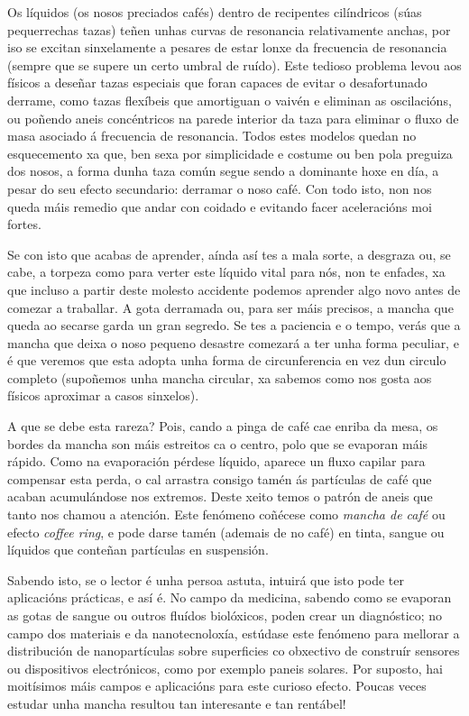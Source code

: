 \begin{multicols}{2}
Os líquidos (os nosos preciados cafés) dentro de recipentes cilíndricos (súas
pequerrechas tazas) teñen unhas curvas de resonancia relativamente anchas, por
iso se excitan sinxelamente a pesares de estar lonxe da frecuencia de resonancia
(sempre que se supere un certo umbral de ruído). Este tedioso problema levou
aos físicos a deseñar tazas especiais que foran capaces de evitar o
desafortunado derrame, como tazas flexíbeis que amortiguan o vaivén e eliminan
as oscilacións, ou poñendo aneis concéntricos na parede interior da taza para
eliminar o fluxo de masa asociado á frecuencia de resonancia. Todos estes
modelos quedan no esquecemento xa que, ben sexa por simplicidade e costume ou
ben pola preguiza dos nosos, a forma dunha taza común segue sendo a dominante
hoxe en día, a pesar do seu efecto secundario: derramar o noso café. Con todo
isto, non nos queda máis remedio que andar con coidado e evitando facer
aceleracións moi fortes.

Se con isto que acabas de aprender, aínda así tes a mala sorte, a desgraza ou,
se cabe, a torpeza como para verter este líquido vital para nós, non te
enfades, xa que incluso a partir deste molesto accidente podemos aprender algo
novo antes de comezar a traballar. A gota derramada ou, para ser máis precisos,
a mancha que queda ao secarse garda un gran segredo. Se tes a paciencia e o
tempo, verás que a mancha que deixa o noso pequeno desastre comezará a ter unha
forma peculiar, e é que veremos que esta adopta unha forma de circunferencia en
vez dun circulo completo (supoñemos unha mancha circular, xa sabemos como nos
gosta aos físicos aproximar a casos sinxelos).

A que se debe esta rareza? Pois, cando a pinga de café cae enriba da mesa, os
bordes da mancha son máis estreitos ca o centro, polo que se evaporan máis
rápido. Como na evaporación pérdese líquido, aparece un fluxo capilar para
compensar esta perda, o cal arrastra consigo tamén ás partículas de café que
acaban acumulándose nos extremos. Deste xeito temos o patrón de aneis que tanto
nos chamou a atención. Este fenómeno coñécese como \textit{mancha de café} ou
efecto \textit{coffee ring}, e pode darse tamén (ademais de no café) en tinta,
sangue ou líquidos que conteñan partículas en suspensión.

Sabendo isto, se o lector é unha persoa astuta, intuirá que isto pode ter
aplicacións prácticas, e así é. No campo da medicina, sabendo como se evaporan
as gotas de sangue ou outros fluídos biolóxicos, poden crear un diagnóstico; no
campo dos materiais e da nanotecnoloxía, estúdase este fenómeno para mellorar a
distribución de nanopartículas sobre superficies co obxectivo de construír
sensores ou dispositivos electrónicos, como por exemplo paneis solares. Por
suposto, hai moitísimos máis campos e aplicacións para este curioso efecto.
Poucas veces estudar unha mancha resultou tan interesante e tan rentábel!


\end{multicols}

